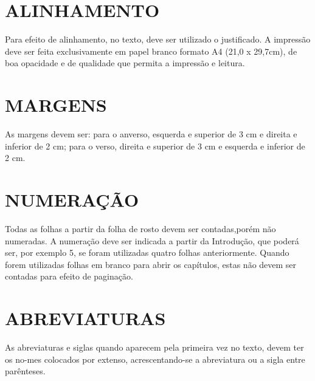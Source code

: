 \section{ALINHAMENTO}

Para efeito de alinhamento, no texto, deve ser utilizado o justificado. A impressão deve ser feita exclusivamente em papel branco formato A4 (21,0 x 29,7cm), de boa opacidade e de qualidade que permita a impressão e leitura.

\section{MARGENS}

As margens devem ser: para o anverso, esquerda e superior de 3 cm e direita e inferior de 2 cm; para o verso, direita e superior de 3 cm e esquerda e inferior de 2 cm.

\section{NUMERAÇÃO}

Todas as folhas a partir da folha de rosto devem ser contadas,porém não numeradas. A numeração deve ser indicada a partir da Introdução, que poderá ser, por exemplo 5, se foram utilizadas quatro folhas anteriormente. Quando forem utilizadas folhas em branco para abrir os capítulos, estas não devem ser contadas para efeito de paginação.

\section{ABREVIATURAS}

As abreviaturas e siglas quando aparecem pela primeira vez no texto, devem ter os no-mes colocados por extenso, acrescentando-se a abreviatura ou a sigla entre parênteses.


